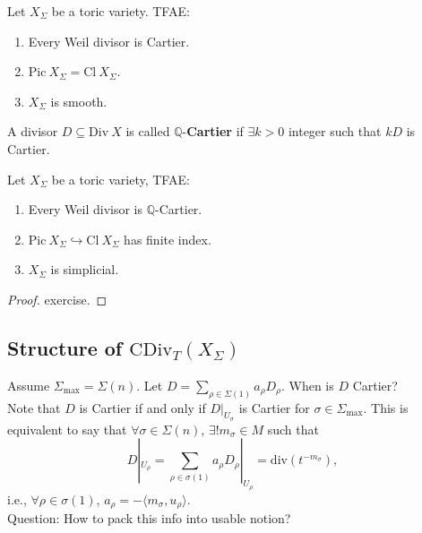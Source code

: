 \documentclass[a4paper,12pt]{amsart}
\newcommand{\Q}{\ensuremath{\mathbb{Q}}}
\newcommand{\divof}[1]{\mathrm{div}(#1)}
\newcommand{\CDiv}{\mathrm{CDiv}}
\newcommand{\Picard}{\mathrm{Pic}~}
\newcommand{\Cl}{\mathrm{Cl}~}
\newcommand{\Divisor}{\mathrm{Div}~}
\begin{document}
\begin{Theorem}
	Let $X_{\Sigma}$ be a toric variety. TFAE:
	\begin{enumerate}[(1)]
		\item Every Weil divisor is Cartier.
		\item $\Picard X_{\Sigma}=\Cl X_{\Sigma}$.
		\item $X_{\Sigma}$ is smooth.
	\end{enumerate}
\end{Theorem}
\begin{Def}
	A divisor $D\subseteq\Divisor X$ is called $\Q$-\textbf{Cartier} if $\exists k>0$ integer such that $kD$ is Cartier.
\end{Def}
\begin{Proposition}
	Let $X_{\Sigma}$ be a toric variety, TFAE:
	\begin{enumerate}[(1)]
		\item Every Weil divisor is $\Q$-Cartier.
		\item $\Picard X_{\Sigma}\hookrightarrow\Cl X_{\Sigma}$ has finite index.
		\item $X_{\Sigma}$ is simplicial.
	\end{enumerate}
\end{Proposition}
\begin{proof}
	exercise.
\end{proof}

\subsection{Structure of $\CDiv_{T}(X_{\Sigma})$}
Assume $\Sigma_{\max}=\Sigma(n)$. Let $D=\sum_{\rho\in \Sigma(1)}a_{\rho}D_{\rho}$. When is $D$ Cartier?\\
Note that $D$ is Cartier if and only if $D|_{U_\sigma}$ is Cartier for $\sigma\in\Sigma_{\max}$. This is equivalent to say that $\forall \sigma\in\Sigma(n)$, $\exists! m_{\sigma}\in M$ such that 
\begin{equation*}
	D|_{U_\rho}=\sum_{\rho\in\sigma(1)}a_{\rho}D_{\rho}|_{U_\rho}=\divof{t^{-m_{\sigma}}},
\end{equation*}
i.e., $\forall\rho\in\sigma(1)$, $a_{\rho}=-\langle m_{\sigma},u_{\rho}\rangle$.\\
Question: How to pack this info into usable notion?
\end{document}
